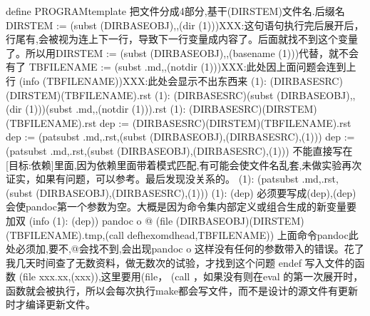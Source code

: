 \documentclass[letterpaper,12pt,english]{sphinxmanual}
\begin{document}
\begin{sphinxVerbatim}[commandchars=\\\{\}]
define PROGRAM\PYGZus{}template
\PYGZsh{}把文件分成4部分,基\PYGZhy{}干(DIR\PYGZus{}STEM)\PYGZhy{}文件名.后缀名
DIR\PYGZus{}STEM := \PYGZdl{}(subst \PYGZdl{}(DIR\PYGZus{}BASE\PYGZus{}OBJ),,\PYGZdl{}(dir \PYGZdl{}(1)))\PYGZsh{}XXX:这句语句执行完后展开后，行尾有\PYGZbs{},会被视为连上下一行，导致下一行变量成内容了。后面就找不到这个变量了。所以用DIR\PYGZus{}STEM := \PYGZdl{}(subst \PYGZdl{}(DIR\PYGZus{}BASE\PYGZus{}OBJ),,\PYGZdl{}(basename \PYGZdl{}(1)))代替，就不会有\PYGZbs{}了
TBFILENAME := \PYGZdl{}(subst .md,,\PYGZdl{}(notdir \PYGZdl{}(1)))\PYGZsh{}XXX:此处因上面问题会连到上行
\PYGZdl{}(info \PYGZdl{}(TBFILENAME))\PYGZsh{}XXX:此处会显示不出东西来
\PYGZsh{}\PYGZdl{}(1): \PYGZdl{}(DIR\PYGZus{}BASE\PYGZus{}SRC)\PYGZdl{}\PYGZdl{}(DIR\PYGZus{}STEM)\PYGZbs{}\PYGZdl{}\PYGZdl{}(TBFILENAME).rst
\PYGZsh{}\PYGZdl{}(1): \PYGZdl{}(DIR\PYGZus{}BASE\PYGZus{}SRC)\PYGZdl{}(subst \PYGZdl{}(DIR\PYGZus{}BASE\PYGZus{}OBJ),,\PYGZdl{}(dir \PYGZdl{}(1)))\PYGZbs{}\PYGZdl{}(subst .md,,\PYGZdl{}(notdir \PYGZdl{}(1))).rst
\PYGZsh{}\PYGZdl{}(1): \PYGZdl{}(DIR\PYGZus{}BASE\PYGZus{}SRC)\PYGZdl{}\PYGZdl{}(DIR\PYGZus{}STEM)\PYGZdl{}\PYGZdl{}(TBFILENAME).rst
\PYGZsh{}dep := \PYGZdl{}(DIR\PYGZus{}BASE\PYGZus{}SRC)\PYGZdl{}\PYGZdl{}(DIR\PYGZus{}STEM)\PYGZbs{}\PYGZdl{}\PYGZdl{}(TBFILENAME).rst
\PYGZsh{}dep := \PYGZdl{}(patsubst \PYGZpc{}.md,\PYGZpc{}.rst,\PYGZdl{}(subst \PYGZdl{}(DIR\PYGZus{}BASE\PYGZus{}OBJ),\PYGZdl{}(DIR\PYGZus{}BASE\PYGZus{}SRC),\PYGZdl{}(1)))
dep := \PYGZdl{}(patsubst \PYGZpc{}.md,\PYGZpc{}.rst,\PYGZdl{}(subst \PYGZdl{}(DIR\PYGZus{}BASE\PYGZus{}OBJ),\PYGZdl{}(DIR\PYGZus{}BASE\PYGZus{}SRC),\PYGZdl{}(1)))
\PYGZsh{}\PYGZsh{}不能直接写在[目标:依赖]里面,因为依赖里面带着模式匹配,有可能会使文件名乱套,未做实验再次证实，如果有问题，可以参考。最后发现没关系的。
\PYGZsh{}\PYGZdl{}(1): \PYGZdl{}(patsubst \PYGZpc{}.md,\PYGZpc{}.rst,\PYGZdl{}(subst \PYGZdl{}(DIR\PYGZus{}BASE\PYGZus{}OBJ),\PYGZdl{}(DIR\PYGZus{}BASE\PYGZus{}SRC),\PYGZdl{}(1)))
\PYGZdl{}(1): \PYGZdl{}\PYGZdl{}(dep)
\PYGZsh{}\PYGZsh{}必须要写成\PYGZdl{}\PYGZdl{}(dep),\PYGZdl{}(dep)会使pandoc第一个参数为空。大概是因为命令集内部定义或组合生成的新变量要加双\PYGZdl{}
 \PYGZdl{}(info \PYGZdl{}(1): \PYGZdl{}(dep))
 pandoc \PYGZdl{}\PYGZdl{}\PYGZlt{} \PYGZhy{}o \PYGZdl{}\PYGZdl{}@
 \PYGZdl{}\PYGZdl{}(file \PYGZgt{}\PYGZdl{}(DIR\PYGZus{}BASE\PYGZus{}OBJ)\PYGZhy{}\PYGZdl{}\PYGZdl{}(DIR\PYGZus{}STEM)\PYGZhy{}\PYGZdl{}\PYGZdl{}(TBFILENAME).tmp,\PYGZdl{}\PYGZdl{}(call def\PYGZus{}hexo\PYGZus{}md\PYGZus{}head,\PYGZdl{}\PYGZdl{}TBFILENAME))
\PYGZsh{}\PYGZsh{} 上面命令pandoc此处必须加\PYGZdl{}\PYGZdl{},要不\PYGZdl{}\PYGZlt{},\PYGZdl{}@会找不到,会出现pandoc \PYGZhy{}o 这样没有任何的参数带入的错误。花了我几天时间查了无数资料，做无数次的试验，才找到这个问题
endef
\PYGZsh{}\PYGZsh{} 写入文件的函数 \PYGZdl{}(file \PYGZgt{}xxx.xx,\PYGZdl{}(xxx)),这里要用\PYGZdl{}\PYGZdl{}(file， \PYGZdl{}\PYGZdl{}(call ，如果没有则在eval 的第一次展开时，函数就会被执行，所以会每次执行make都会写文件，而不是设计的源文件有更新时才编译更新文件。


\end{sphinxVerbatim}
\end{document}
